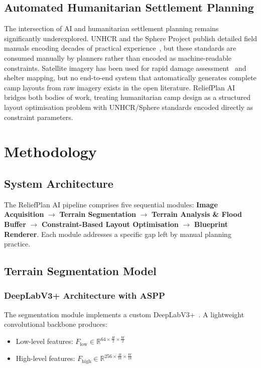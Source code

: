 \documentclass[twocolumn]{article}
\begin{document}
\subsection{Automated Humanitarian Settlement Planning}

The intersection of AI and humanitarian settlement planning remains significantly underexplored.
UNHCR and the Sphere Project publish detailed field manuals encoding decades of practical
experience~\cite{unhcr_handbook,sphere_handbook}, but these standards are consumed manually by
planners rather than encoded as machine-readable constraints.
Satellite imagery has been used for rapid damage assessment~\cite{copernicus_em} and shelter
mapping, but no end-to-end system that automatically generates complete camp layouts from raw
imagery exists in the open literature.
ReliefPlan AI bridges both bodies of work, treating humanitarian camp design as a structured layout
optimisation problem with UNHCR/Sphere standards encoded directly as constraint parameters.

\section{Methodology}
\label{sec:methodology}

\subsection{System Architecture}

The ReliefPlan AI pipeline comprises five sequential modules:
\textbf{Image Acquisition} $\rightarrow$
\textbf{Terrain Segmentation} $\rightarrow$
\textbf{Terrain Analysis \& Flood Buffer} $\rightarrow$
\textbf{Constraint-Based Layout Optimisation} $\rightarrow$
\textbf{Blueprint Renderer}.
Each module addresses a specific gap left by manual planning practice.

\subsection{Terrain Segmentation Model}

\subsubsection{DeepLabV3+ Architecture with ASPP}

The segmentation module implements a custom DeepLabV3+~\cite{deeplabv3plus}.
A lightweight convolutional backbone produces:
\begin{itemize}[leftmargin=*,nosep,topsep=2pt]
  \item Low-level features:
    $F_\mathrm{low}\in\mathbb{R}^{64\times\frac{H}{2}\times\frac{W}{2}}$
  \item High-level features:
    $F_\mathrm{high}\in\mathbb{R}^{256\times\frac{H}{16}\times\frac{W}{16}}$
\end{itemize}
\end{document}
